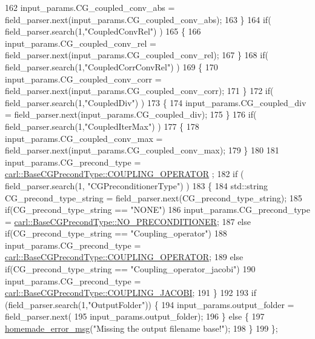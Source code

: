 \begin{DoxyCode}
162         input\_params.CG\_coupled\_conv\_abs = field\_parser.next(input\_params.CG\_coupled\_conv\_abs);
163     \}
164     \textcolor{keywordflow}{if}( field\_parser.search(1,\textcolor{stringliteral}{"CoupledConvRel"}) )
165     \{
166         input\_params.CG\_coupled\_conv\_rel = field\_parser.next(input\_params.CG\_coupled\_conv\_rel);
167     \}
168     \textcolor{keywordflow}{if}( field\_parser.search(1,\textcolor{stringliteral}{"CoupledCorrConvRel"}) )
169     \{
170         input\_params.CG\_coupled\_conv\_corr = field\_parser.next(input\_params.CG\_coupled\_conv\_corr);
171     \}
172     \textcolor{keywordflow}{if}( field\_parser.search(1,\textcolor{stringliteral}{"CoupledDiv"}) )
173     \{
174         input\_params.CG\_coupled\_div = field\_parser.next(input\_params.CG\_coupled\_div);
175     \}
176     \textcolor{keywordflow}{if}( field\_parser.search(1,\textcolor{stringliteral}{"CoupledIterMax"}) )
177     \{
178         input\_params.CG\_coupled\_conv\_max = field\_parser.next(input\_params.CG\_coupled\_conv\_max);
179     \}
180     
181     input\_params.CG\_precond\_type = \hyperlink{namespacecarl_ad52f21755b51ffa926038b59ae194ea8a0bdc3f2b24ccb8a7783e5cc3845f66f4}{carl::BaseCGPrecondType::COUPLING\_OPERATOR}
      ;
182     \textcolor{keywordflow}{if} ( field\_parser.search(1, \textcolor{stringliteral}{"CGPreconditionerType"}) )
183     \{
184         std::string CG\_precond\_type\_string = field\_parser.next(CG\_precond\_type\_string);
185         \textcolor{keywordflow}{if}(CG\_precond\_type\_string == \textcolor{stringliteral}{"NONE"})
186             input\_params.CG\_precond\_type = 
      \hyperlink{namespacecarl_ad52f21755b51ffa926038b59ae194ea8ad142a27fc7dfef6e36c5d01689880cc4}{carl::BaseCGPrecondType::NO\_PRECONDITIONER};
187         \textcolor{keywordflow}{else} \textcolor{keywordflow}{if}(CG\_precond\_type\_string == \textcolor{stringliteral}{"Coupling\_operator"})
188             input\_params.CG\_precond\_type = 
      \hyperlink{namespacecarl_ad52f21755b51ffa926038b59ae194ea8a0bdc3f2b24ccb8a7783e5cc3845f66f4}{carl::BaseCGPrecondType::COUPLING\_OPERATOR};
189         \textcolor{keywordflow}{else} \textcolor{keywordflow}{if}(CG\_precond\_type\_string == \textcolor{stringliteral}{"Coupling\_operator\_jacobi"})
190             input\_params.CG\_precond\_type = 
      \hyperlink{namespacecarl_ad52f21755b51ffa926038b59ae194ea8a9e4642aac714757473ea34db75279a99}{carl::BaseCGPrecondType::COUPLING\_JACOBI};
191     \}
192 
193     \textcolor{keywordflow}{if} (field\_parser.search(1,\textcolor{stringliteral}{"OutputFolder"})) \{
194         input\_params.output\_folder = field\_parser.next(
195                 input\_params.output\_folder);
196     \} \textcolor{keywordflow}{else} \{
197         \hyperlink{common__header_8h_a05d65d26b911668ac90085745dca71f6}{homemade\_error\_msg}(\textcolor{stringliteral}{"Missing the output filename base!"});
198     \}
199 \};
\end{DoxyCode}
\hypertarget{namespacecarl_aebc298614cba13aa318064e3ad08bc10}{}

